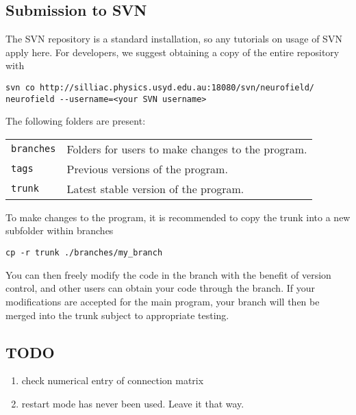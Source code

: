 \documentclass[12pt,a4paper]{article}
\newcommand{\type}[1]{ {\small\small\tt #1} }
\begin{document}


\subsection{Submission to SVN}
The SVN repository is a standard installation, so any tutorials on usage of SVN apply here. For developers, we suggest obtaining a copy of the entire repository with

\begin{lstlisting}
svn co http://silliac.physics.usyd.edu.au:18080/svn/neurofield/ neurofield --username=<your SVN username>
\end{lstlisting}
	
The following folders are present:

\begin{tabular}{l p{12cm}}
\type{branches}& Folders for users to make changes to the program.\\
\type{tags}& Previous versions of the program.\\
\type{trunk}& Latest stable version of the program.\\
\end{tabular}

To make changes to the program, it is recommended to copy the trunk into a new subfolder within branches

\begin{lstlisting}
cp -r trunk ./branches/my_branch
\end{lstlisting}
	
You can then freely modify the code in the branch with the benefit of version control, and other users can obtain your code through the branch. If your modifications are accepted for the main program, your branch will then be merged into the trunk subject to appropriate testing.

\subsection{TODO}
\begin{enumerate}
\item check numerical entry of connection matrix
\item restart mode has never been used. Leave it that way.
\end{enumerate}
\end{document}
